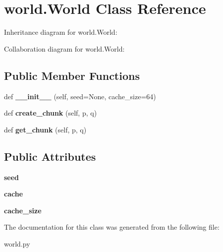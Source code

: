 \hypertarget{classworld_1_1World}{}\section{world.\+World Class Reference}
\label{classworld_1_1World}


Inheritance diagram for world.\+World\+:


Collaboration diagram for world.\+World\+:
\subsection*{Public Member Functions}
\begin{DoxyCompactItemize}
\item 
\mbox{\label{classworld_1_1World_aa14e7c2893fec3ed9c695cf5ba95f214}} 
def {\bfseries \+\_\+\+\_\+init\+\_\+\+\_\+} (self, seed=None, cache\+\_\+size=64)
\item 
\mbox{\label{classworld_1_1World_a35a2813203e7b5a462d59c82a4f24e35}} 
def {\bfseries create\+\_\+chunk} (self, p, q)
\item 
\mbox{\label{classworld_1_1World_ae097762534f93095dcd5b420aec65525}} 
def {\bfseries get\+\_\+chunk} (self, p, q)
\end{DoxyCompactItemize}
\subsection*{Public Attributes}
\begin{DoxyCompactItemize}
\item 
\mbox{\label{classworld_1_1World_a4574f62bbf51758fe54381eb4b655505}} 
{\bfseries seed}
\item 
\mbox{\label{classworld_1_1World_ac976ce86e41ea59f72ed21dac773419d}} 
{\bfseries cache}
\item 
\mbox{\label{classworld_1_1World_aba042cdb1aa2f95a6eef806fc26b28ef}} 
{\bfseries cache\+\_\+size}
\end{DoxyCompactItemize}


The documentation for this class was generated from the following file\+:\begin{DoxyCompactItemize}
\item 
world.\+py\end{DoxyCompactItemize}
